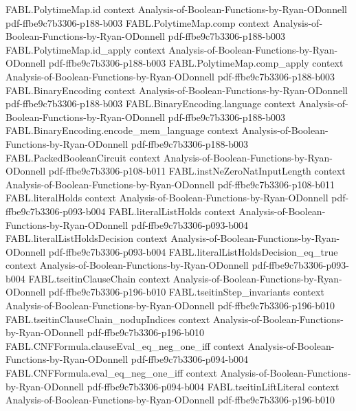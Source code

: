 \begin{theorem}
\proofstep
  {FABL.PolytimeMap.id}
  {context}
  {Analysis-of-Boolean-Functions-by-Ryan-ODonnell}
  {pdf-ffbe9c7b3306-p188-b003}
\proofstep
  {FABL.PolytimeMap.comp}
  {context}
  {Analysis-of-Boolean-Functions-by-Ryan-ODonnell}
  {pdf-ffbe9c7b3306-p188-b003}
\proofstep
  {FABL.PolytimeMap.id_apply}
  {context}
  {Analysis-of-Boolean-Functions-by-Ryan-ODonnell}
  {pdf-ffbe9c7b3306-p188-b003}
\proofstep
  {FABL.PolytimeMap.comp_apply}
  {context}
  {Analysis-of-Boolean-Functions-by-Ryan-ODonnell}
  {pdf-ffbe9c7b3306-p188-b003}
\proofstep
  {FABL.BinaryEncoding}
  {context}
  {Analysis-of-Boolean-Functions-by-Ryan-ODonnell}
  {pdf-ffbe9c7b3306-p188-b003}
\proofstep
  {FABL.BinaryEncoding.language}
  {context}
  {Analysis-of-Boolean-Functions-by-Ryan-ODonnell}
  {pdf-ffbe9c7b3306-p188-b003}
\proofstep
  {FABL.BinaryEncoding.encode_mem_language}
  {context}
  {Analysis-of-Boolean-Functions-by-Ryan-ODonnell}
  {pdf-ffbe9c7b3306-p188-b003}
\proofstep
  {FABL.PackedBooleanCircuit}
  {context}
  {Analysis-of-Boolean-Functions-by-Ryan-ODonnell}
  {pdf-ffbe9c7b3306-p108-b011}
\proofstep
  {FABL.instNeZeroNatInputLength}
  {context}
  {Analysis-of-Boolean-Functions-by-Ryan-ODonnell}
  {pdf-ffbe9c7b3306-p108-b011}
\proofstep
  {FABL.literalHolds}
  {context}
  {Analysis-of-Boolean-Functions-by-Ryan-ODonnell}
  {pdf-ffbe9c7b3306-p093-b004}
\proofstep
  {FABL.literalListHolds}
  {context}
  {Analysis-of-Boolean-Functions-by-Ryan-ODonnell}
  {pdf-ffbe9c7b3306-p093-b004}
\proofstep
  {FABL.literalListHoldsDecision}
  {context}
  {Analysis-of-Boolean-Functions-by-Ryan-ODonnell}
  {pdf-ffbe9c7b3306-p093-b004}
\proofstep
  {FABL.literalListHoldsDecision_eq_true}
  {context}
  {Analysis-of-Boolean-Functions-by-Ryan-ODonnell}
  {pdf-ffbe9c7b3306-p093-b004}
\proofstep
  {FABL.tseitinClauseChain}
  {context}
  {Analysis-of-Boolean-Functions-by-Ryan-ODonnell}
  {pdf-ffbe9c7b3306-p196-b010}
\proofstep
  {FABL.tseitinStep_invariants}
  {context}
  {Analysis-of-Boolean-Functions-by-Ryan-ODonnell}
  {pdf-ffbe9c7b3306-p196-b010}
\proofstep
  {FABL.tseitinClauseChain_nodupIndices}
  {context}
  {Analysis-of-Boolean-Functions-by-Ryan-ODonnell}
  {pdf-ffbe9c7b3306-p196-b010}
\proofstep
  {FABL.CNFFormula.clauseEval_eq_neg_one_iff}
  {context}
  {Analysis-of-Boolean-Functions-by-Ryan-ODonnell}
  {pdf-ffbe9c7b3306-p094-b004}
\proofstep
  {FABL.CNFFormula.eval_eq_neg_one_iff}
  {context}
  {Analysis-of-Boolean-Functions-by-Ryan-ODonnell}
  {pdf-ffbe9c7b3306-p094-b004}
\proofstep
  {FABL.tseitinLiftLiteral}
  {context}
  {Analysis-of-Boolean-Functions-by-Ryan-ODonnell}
  {pdf-ffbe9c7b3306-p196-b010}

\end{theorem}
